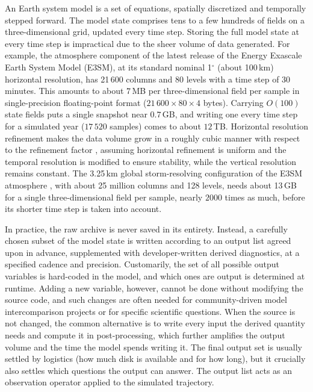 \documentclass[gmd, manuscript]{copernicus}
\begin{document}
\introduction
\label{sec:intro}

An Earth system model is a set of equations, spatially discretized and temporally stepped forward. The model state comprises tens to a few hundreds of fields on a three-dimensional grid, updated every time step. Storing the full model state at every time step is impractical due to the sheer volume of data generated. For example, the atmosphere component of the latest release of the Energy Exascale Earth System Model (E3SM), at its standard nominal 1$^\circ$ (about 100\,km) horizontal resolution, has 21\,600 columns and 80 levels with a time step of 30 minutes. This amounts to about $7$\,MB per three-dimensional field per sample in single-precision floating-point format ($21\,600\times80\times4$ bytes). Carrying $O(100)$ state fields puts a single snapshot near $0.7$\,GB, and writing one every time step for a simulated year ($17\,520$ samples) comes to about $12$\,TB. Horizontal resolution refinement makes the data volume grow in a roughly cubic manner with respect to the refinement factor \citep{schar_kilometer-scale_2020}, assuming horizontal refinement is uniform and the temporal resolution is modified to ensure stability, while the vertical resolution remains constant. The 3.25\,km global storm-resolving configuration of the E3SM atmosphere \citep{caldwell_convectionpermitting_2021}, with about 25 million columns and 128 levels, needs about 13\,GB for a single three-dimensional field per sample, nearly $2000$ times as much, before its shorter time step is taken into account.

In practice, the raw archive is never saved in its entirety. Instead, a carefully chosen subset of the model state is written according to an output list agreed upon in advance, supplemented with developer-written derived diagnostics, at a specified cadence and precision. Customarily, the set of all possible output variables is hard-coded in the model, and which ones are output is determined at runtime. Adding a new variable, however, cannot be done without modifying the source code, and such changes are often needed for community-driven model intercomparison projects or for specific scientific questions. When the source is not changed, the common alternative is to write every input the derived quantity needs and compute it in post-processing, which further amplifies the output volume and the time the model spends writing it. The final output set is usually settled by logistics (how much disk is available and for how long), but it crucially also settles which questions the output can answer. The output list acts as an observation operator applied to the simulated trajectory.
\end{document}
